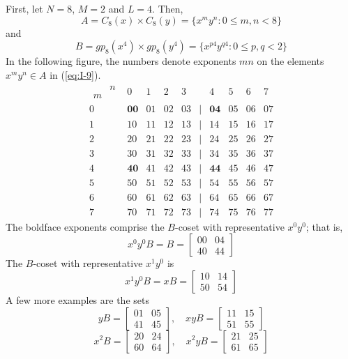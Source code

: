 \begin{example}
First, let $N=8$, $M=2$ and $L=4$.  Then,
\begin{equation}\label{eq:I-9}
A = C_8(x) \times C_8(y) = \{x^m y^n : 0 \leq m,n < 8 \}
\end{equation}
and
\[
B = gp_8(x^4) \times gp_8(y^4) = \{x^{p4} y^{q4} : 0 \leq p,q < 2 \}
\]
In the following figure, the numbers denote exponents $mn$ on the
elements $x^my^n \in A$ in (\ref{eq:I-9}). 
\[
\begin{matrix}  
\begin{array}{cc} & n\\
                m & \end{array} & 0 & 1 & 2 & 3 &  & 4 & 5 & 6 & 7\\
0 & \mathbf{00} & 01 & 02 & 03 & | & \mathbf{04} & 05 & 06 & 07\\
1 & 10 & 11 & 12 & 13 & | & 14 & 15 & 16 & 17\\
2 & 20 & 21 & 22 & 23 & | & 24 & 25 & 26 & 27\\
3 & 30 & 31 & 32 & 33 & | & 34 & 35 & 36 & 37\\
\hline
4 & \mathbf{40} & 41 & 42 & 43 & | & \mathbf{44} & 45 & 46 & 47\\
5 & 50 & 51 & 52 & 53 & | & 54 & 55 & 56 & 57\\
6 & 60 & 61 & 62 & 63 & | & 64 & 65 & 66 & 67\\
7 & 70 & 71 & 72 & 73 & | & 74 & 75 & 76 & 77
\end{matrix}\]
The boldface exponents comprise the $B$-coset with representative
$x^0y^0$; that is,
\[
x^0y^0B = B = \begin{bmatrix} 00 & 04 \\ 40 & 44 \end{bmatrix}
\]
The $B$-coset with representative $x^1y^0$ is 
\[
x^1y^0B = xB = \begin{bmatrix}10 & 14 \\ 50 & 54 \end{bmatrix}
\]
A few more examples are the sets
\[
yB = \begin{bmatrix} 01 & 05 \\ 41 & 45 \end{bmatrix}, \quad
xyB = \begin{bmatrix} 11 & 15 \\ 51 & 55 \end{bmatrix}
\]
\[
x^2B = \begin{bmatrix} 20 & 24 \\ 60 & 64 \end{bmatrix}, \quad
x^2yB = \begin{bmatrix} 21 & 25 \\ 61 & 65 \end{bmatrix}
\]
\end{example}
